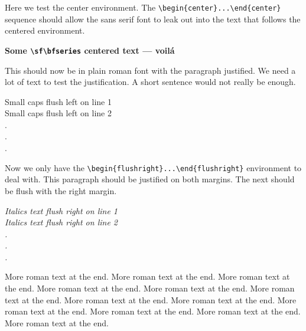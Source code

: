\documentclass{article}
\begin{document}
Here we test the center environment.  The \verb#\begin{center}...\end{center}#
sequence should allow the sans serif font to leak out into the text that follows
the centered environment. 

\begin{center}
\sf\bfseries Some \verb#\sf\bfseries# centered text --- voil\'a
\end{center}

This should now be in plain roman font with the paragraph justified.
We need a lot of text to test the justification.  A short sentence would
not really be enough.

\begin{flushleft}
\sc Small caps flush left on line 1 \\
Small caps flush left on line 2 \\
.\\
.\\
.\\
\end{flushleft}

Now we only have the \verb#\begin{flushright}...\end{flushright}# environment
to deal with.  This paragraph should be justified on both margins. The next should
be flush with the right margin.

\begin{flushright}
\itshape 
Italics text flush right on line 1 \\
Italics text flush right on line 2 \\
.\\
.\\
.\\
\end{flushright}

More roman text at the end. More roman text at the end. More roman text at the end. 
More roman text at the end. More roman text at the end. More roman text at the end.
More roman text at the end. More roman text at the end. More roman text at the end.
More roman text at the end. More roman text at the end. More roman text at the end.
\end{document}
